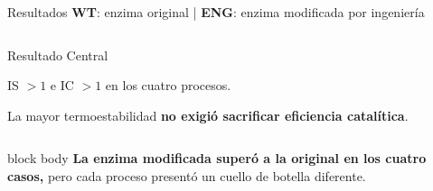 \begin{frame}[label=resumen_resultados]{Resultados \hfill{\tiny\color{TextoSuave}\textbf{WT}: enzima original \quad | \quad \textbf{ENG}: enzima modificada por ingeniería}}
\begin{columns}[T,onlytextwidth]
\vspace{0.07cm}

\begin{alertblock}{Resultado Central}
\centering
\scriptsize\bfseries

IS $>1$ e IC $>1$ en los cuatro procesos.

\vspace{0.03cm}

La mayor termoestabilidad \textbf{no exigió sacrificar eficiencia catalítica}.
\end{alertblock}

\end{columns}

\vspace{0.05cm}

\begin{beamercolorbox}[
    wd=\linewidth,
    sep=0.07cm,
    rounded=true,
    center
]{block body}
\scriptsize
\textbf{La enzima modificada superó a la original en los cuatro casos,}
pero cada proceso presentó un cuello de botella diferente.
\end{beamercolorbox}

\vfill

\begin{columns}[b,onlytextwidth]



\raggedleft
{}

\end{columns}

\end{frame}